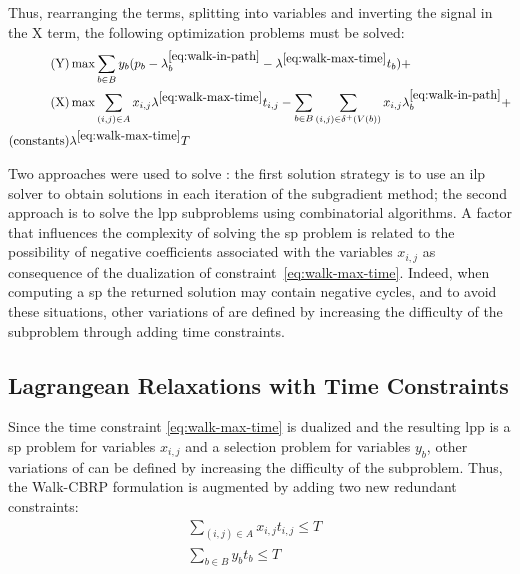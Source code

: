 Thus, rearranging the terms, splitting into variables and inverting the signal in the X
term, the following optimization problems must be solved:
\begin{align}
	\text{(Y)}         & \max \sum_{b \in B} y_{b} (p_b - \lambda^{\ref{eq:walk-in-path}}_{b} - \lambda^{\ref{eq:walk-max-time}}_{} t_b) +                                                            \\
	\text{(X)}         & \max \sum_{(i,j) \in A} x_{i,j} \lambda^{\ref{eq:walk-max-time}}_{} t_{i,j} - \sum_{b \in B} \sum_{(i,j) \in \delta^{+}(V(b))} x_{i,j} \lambda^{\ref{eq:walk-in-path}}_{b} + \\
	\text{(constants)} & \lambda^{\ref{eq:walk-max-time}}_{} T
\end{align}

Two approaches were used to solve {\lrsp}:  the first solution strategy is to use
an \gls{ilp}  solver to obtain  solutions in  each iteration of  the subgradient
method;  the  second  approach  is  to solve  the  \gls{lpp}  subproblems  using
combinatorial  algorithms.  A factor  that  influences  the complexity  of
solving  the  \gls{sp}  problem  is  related  to  the  possibility  of  negative
coefficients associated  with the variables  $x_{i,j}$ as consequence  of the
dualization of constraint~\eqref{eq:walk-max-time}.  Indeed, when  computing a
\gls{sp} the returned  solution may contain negative cycles, and  to avoid these
situations, other variations of {\lrsp} are defined by increasing the difficulty
of the subproblem through adding time constraints.

\subsection{Lagrangean Relaxations with Time Constraints}\label{subsec:lr-time-constraints}

Since the time constraint \eqref{eq:walk-max-time} is dualized and the resulting
\gls{lpp} is a \gls{sp} problem for variables $x_{i,j}$ and a selection problem for variables $y_b$,
other variations of {\lrsp} can be defined by increasing the difficulty of the subproblem.
Thus, the Walk-CBRP formulation is augmented by adding two new redundant constraints:
\begin{align}
	\sum_{(i,j) \in A} x_{i,j}t_{i,j} \leq T & \label{eq:arc-time-constraints}   \\
	\sum_{b \in B} y_b t_b \leq T            & \label{eq:block-time-constraints}
\end{align}

